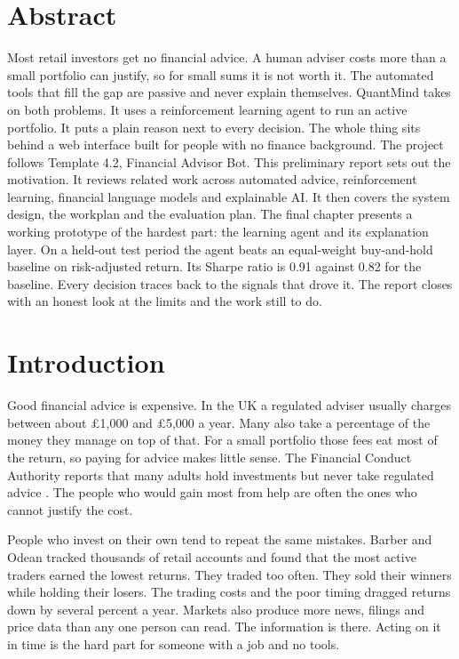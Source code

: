 \documentclass[12pt,twoside,letterpaper]{article}
\begin{document}


\section*{Abstract}

Most retail investors get no financial advice. A human adviser costs more than a
small portfolio can justify, so for small sums it is not worth it. The automated
tools that fill the gap are passive and never explain themselves. QuantMind takes
on both problems. It uses a reinforcement learning agent to run an active
portfolio. It puts a plain reason next to every decision. The whole thing sits
behind a web interface built for people with no finance background. The project
follows Template 4.2, Financial Advisor Bot. This preliminary report sets out the
motivation. It reviews related work across automated advice, reinforcement
learning, financial language models and explainable AI. It then covers the system
design, the workplan and the evaluation plan. The final chapter presents a working
prototype of the hardest part: the learning agent and its explanation layer. On a
held-out test period the agent beats an equal-weight buy-and-hold baseline on
risk-adjusted return. Its Sharpe ratio is 0.91 against 0.82 for the baseline.
Every decision traces back to the signals that drove it. The report closes with an
honest look at the limits and the work still to do.

\newpage
\tableofcontents
\newpage

\section{Introduction}

Good financial advice is expensive. In the UK a regulated adviser usually charges
between about \pounds1{,}000 and \pounds5{,}000 a year. Many also take a percentage
of the money they manage on top of that. For a small portfolio those fees eat most
of the return, so paying for advice makes little sense. The Financial Conduct
Authority reports that many adults hold investments but never take regulated advice
\cite{fca2023}. The people who would gain most from help are often the ones who
cannot justify the cost.

People who invest on their own tend to repeat the same mistakes. Barber and Odean
\cite{barber2000} tracked thousands of retail accounts and found that the most
active traders earned the lowest returns. They traded too often. They sold their
winners while holding their losers. The trading costs and the poor timing dragged
returns down by several percent a year. Markets also produce more news, filings and
price data than any one person can read. The information is there. Acting on it in
time is the hard part for someone with a job and no tools.
\end{document}
